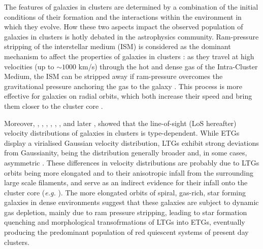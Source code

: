 \documentclass{aa}
\begin{document}
The features of galaxies in clusters are determined by a combination of the initial conditions of their formation and the interactions within the environment in which they evolve. How these two aspects impact the observed population of galaxies in clusters is hotly debated in the astrophysics community. Ram-pressure stripping of the interstellar medium (ISM) is considered as the dominant mechanism to affect the properties of galaxies in clusters \citep{Boselli_2022, Xie_2025}: as they travel at high velocities (up to $\sim 1000$ km/s) through the hot and dense gas of the Intra-Cluster Medium, the ISM can be stripped away if ram-pressure overcomes the gravitational pressure anchoring the gas to the galaxy \citep{Gunn_1972}.
This process is more effective for galaxies on radial orbits, which both increase their speed and bring them closer to the cluster core \citep{Vollmer_2001, Singh_2019}. 

Moreover, \citet{Tammann72}, \citet{MD77}, \citet{Sodre+89}, \citet{Biviano+92}, \citet{Colless_1996}, \citet{ABM98}, and later \citet{Boselli_2006}, showed that the line-of-sight (LoS hereafter) velocity distributions of galaxies in clusters is type-dependent. While ETGs display a virialised Gaussian velocity distribution, LTGs exhibit strong deviations from Gaussianity, being the distribution generally broader and, in some cases, asymmetric \citep{ZF93,Biviano+97}. These differences in velocity distributions are probably due to LTGs orbits being more elongated and to their anisotropic infall from the surrounding large scale filaments,
and serve as an indirect evidence for their infall onto the cluster core (\textit{e.g.} \citealt{Mamon_2019,Pizzuti_2025b}). The more elongated orbits of spiral, gas-rich, star forming galaxies in dense environments suggest that these galaxies are subject to dynamic gas depletion, mainly due to ram pressure stripping, leading to star formation quenching and morphological transofrmations of LTGs into ETGs, eventually producing the predominant population of red quiescent systems of present day clusters.
\medskip


\end{document}
